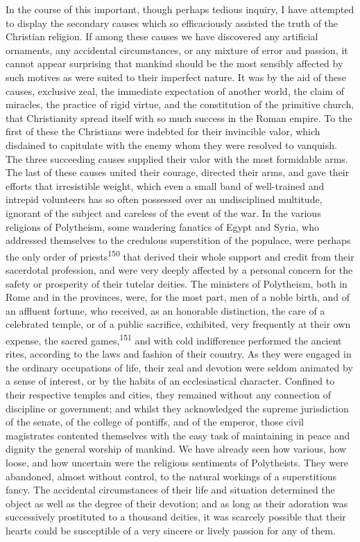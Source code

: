 In the course of this important, though perhaps tedious inquiry,
I have attempted to display the secondary causes which so
efficaciously assisted the truth of the Christian religion. If
among these causes we have discovered any artificial ornaments,
any accidental circumstances, or any mixture of error and
passion, it cannot appear surprising that mankind should be the
most sensibly affected by such motives as were suited to their
imperfect nature. It was by the aid of these causes, exclusive
zeal, the immediate expectation of another world, the claim of
miracles, the practice of rigid virtue, and the constitution of
the primitive church, that Christianity spread itself with so
much success in the Roman empire. To the first of these the
Christians were indebted for their invincible valor, which
disdained to capitulate with the enemy whom they were resolved to
vanquish. The three succeeding causes supplied their valor with
the most formidable arms. The last of these causes united their
courage, directed their arms, and gave their efforts that
irresistible weight, which even a small band of well-trained and
intrepid volunteers has so often possessed over an undisciplined
multitude, ignorant of the subject and careless of the event of
the war. In the various religions of Polytheism, some wandering
fanatics of Egypt and Syria, who addressed themselves to the
credulous superstition of the populace, were perhaps the only
order of priests\textsuperscript{150} that derived their whole support and credit
from their sacerdotal profession, and were very deeply affected
by a personal concern for the safety or prosperity of their
tutelar deities. The ministers of Polytheism, both in Rome and in
the provinces, were, for the most part, men of a noble birth, and
of an affluent fortune, who received, as an honorable
distinction, the care of a celebrated temple, or of a public
sacrifice, exhibited, very frequently at their own expense, the
sacred games,\textsuperscript{151} and with cold indifference performed the
ancient rites, according to the laws and fashion of their
country. As they were engaged in the ordinary occupations of
life, their zeal and devotion were seldom animated by a sense of
interest, or by the habits of an ecclesiastical character.
Confined to their respective temples and cities, they remained
without any connection of discipline or government; and whilst
they acknowledged the supreme jurisdiction of the senate, of the
college of pontiffs, and of the emperor, those civil magistrates
contented themselves with the easy task of maintaining in peace
and dignity the general worship of mankind. We have already seen
how various, how loose, and how uncertain were the religious
sentiments of Polytheists. They were abandoned, almost without
control, to the natural workings of a superstitious fancy. The
accidental circumstances of their life and situation determined
the object as well as the degree of their devotion; and as long
as their adoration was successively prostituted to a thousand
deities, it was scarcely possible that their hearts could be
susceptible of a very sincere or lively passion for any of them.

